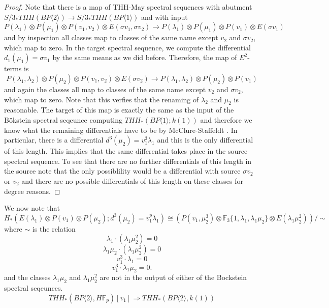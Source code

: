 
\begin{proof}
Note that there is a map of THH-May spectral sequences with abutment $S/3_*THH(BP\langle2\rangle)\rightarrow S/3_*THH(BP\langle 1 \rangle )$ and with input 
\[ P(\lambda_1)\otimes P(\mu_1)\otimes P(v_1,v_2)\otimes E(\sigma v_1,\sigma v_2) \rightarrow P(\lambda_1)\otimes P(\mu_1) \otimes P(v_1)\otimes E(\sigma v_1) \]
and by inspection all classes map to classes of the same name except $v_2$ and $\sigma v_2$, which map to zero. In the target spectral sequence, we compute the differential $d_1(\mu_1)=\sigma v_1$ by the same means as we did before. Therefore, the map of $E^2$-terms is 
\[ P(\lambda_1,\lambda_2)\otimes P(\mu_2)\otimes P(v_1,v_2)\otimes E(\sigma v_2) \rightarrow  P(\lambda_1,\lambda_2)\otimes P(\mu_2)\otimes P(v_1) \]
and again the classes all map to classes of the same name except $v_2$ and $\sigma v_2$, which map to zero. Note that this verfies that the renaming of $\lambda_2$ and $\mu_2$ is reasonable. The target of this map is exactly the same as the input of the B\"okstein spectral seqeunce computing $THH_*(BP\langle 1\rangle ; k(1))$ and therefore we know what the remaining differentials have to be by McClure-Staffeldt \cite{McClureStaffeldt}. In particular, there is a differential $d^3(\mu_2)=v_1^3\lambda_1$ and this is the only differential of this length. This implies that the same differential takes place in the source spectral sequence. To see that there are no further differentials of this length in the source note that the only possiblility would be a differential with source $\sigma v_2$ or $v_2$ and there are no possible differentials of this length on these classes for degree reasons. 
\end{proof}
We now note that 
\[ H_*(E(\lambda_1)\otimes P(v_1)\otimes P(\mu_2 ); d^3(\mu_2)=v_1^p\lambda_1) \cong \left (P(v_1,\mu_2^3)\otimes \mathbb{F}_3\{1,\lambda_1, \lambda_1\mu_2\}\otimes E(\lambda_1\mu_2^2)\right )/\sim\]
where $\sim$ is the relation 
\[ \lambda_1\cdot (\lambda_1\mu_2^2) =0 \]
\[ \lambda_1\mu_2 \cdot (\lambda_1\mu_2^2) =0 \]
\[ v_1^3\cdot \lambda_1 =0 \]
\[ v_1^3 \cdot \lambda_1\mu_2 = 0. \]
and the classes $\lambda_1\mu_2$ and $\lambda_1\mu_2^2$ are not in the output of either of the Bockstein spectral seqeunces. 
\[ THH_*(BP\langle 2\rangle , H\mathbb{F}_p)[v_1] \Rightarrow  THH_*(BP\langle 2 \rangle , k(1) ) \]
